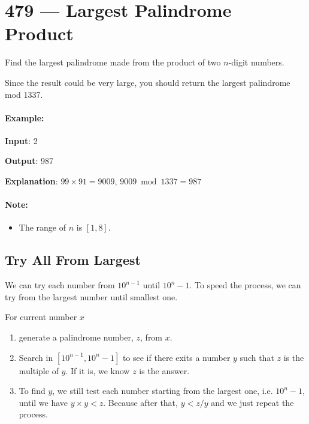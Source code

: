 \section{479 --- Largest Palindrome Product}
Find the largest palindrome made from the product of two $n$-digit numbers.

Since the result could be very large, you should return the largest palindrome mod 1337.
 

\paragraph{Example:}
\begin{flushleft}

\textbf{Input}: 2

\textbf{Output}: 987

\textbf{Explanation}: $99 \times 91 = 9009$, $9009 \bmod 1337 = 987$

\end{flushleft}
 

\paragraph{Note:}

\begin{itemize}
\item The range of $n$ is $[1,8]$.
\end{itemize}

\subsection{Try All From Largest}

We can try each number from $10 ^{n-1}$ until $10^{n}-1$. To speed the process, we can try from the largest number until smallest one.

For current number $x$
\begin{enumerate}
\item generate a palindrome number, $z$, from $x$.
\item Search in $[10^{n-1}, 10^n-1]$ to see if there exits a number $y$ such that $z$ is the multiple of $y$. If it is, we know $z$ is the answer.
\item To find $y$, we still test each number starting from the largest one, i.e. $10^n-1$, until we have $y\times y < z$. Because after that, $y < z/y$ and we just repeat the process.
\end{enumerate}

